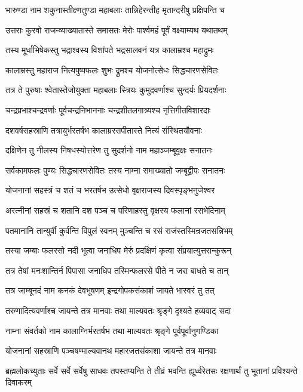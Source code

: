 \twolineshloka
{भारुण्डा नाम शकुनास्तीक्ष्णतुण्डा महाबलाः}
{तान्निहेरन्तीह मृतान्दरीषु प्रक्षिपन्ति च}


\twolineshloka
{उत्तराः कुरवो राजन्व्याख्यातास्ते समासतः}
{मेरोः पार्श्वमहं पूर्वं वक्ष्याम्यथ यथातथम्}


\twolineshloka
{तस्य मूर्धाभिषेकस्तु भद्राश्वस्य विशांपते}
{भद्रसालवनं यत्र कालाम्रश्च महाद्रुमः}


\twolineshloka
{कालाम्रस्तु महाराज नित्यपुष्पफलः शुभः}
{द्रुमश्च योजनोत्सेधः सिद्धचारणसेवितः}


\twolineshloka
{तत्र ते पुरुषाः श्वेतास्तेजोयुक्ता महाबलाः}
{स्त्रियः कुमुदवर्णाश्च सुन्दर्यः प्रियदर्शनाः}


\twolineshloka
{चन्द्रप्रभाश्चन्द्रवर्णाः पूर्वचन्द्रनिभाननाः}
{चन्द्रशीतलगात्र्यश्च नृत्तिगीतविशारदाः}


\twolineshloka
{दशवर्षसहस्राणि तत्रायुर्भरतर्षभ}
{कालाम्ररसपीतास्ते नित्यं संस्थितयौवनाः}


\twolineshloka
{दक्षिणेन तु नीलस्य निषधस्योत्तरेण तु}
{सुदर्शनो नाम महाञ्जम्बूवृक्षः सनातनः}


\twolineshloka
{सर्वकामफलः पुण्यः सिद्धचारणसेवितः}
{तस्य नाम्ना समाख्यातो जम्बूद्वीपः सनातनः}


\twolineshloka
{योजनानां सहस्त्रं च शतं च भरतर्षभ}
{उत्सेधो वृक्षराजस्य दिवस्पृङ्भनुजेश्वर}


\twolineshloka
{अरत्नीनां सहस्रं च शतानि दश पञ्च च}
{परिणाहस्तु वृक्षस्य फलानां रसभेदिनाम्}


\twolineshloka
{पतमानानि तान्युर्वी कुर्वन्ति विपुलं स्वनम्}
{मुञ्चन्ति च रसं राजंस्तस्मिन्रजतसन्निभम्}


\twolineshloka
{तस्या जम्बाः फलरसो नदी भूत्वा जनाधिप}
{मेरुं प्रदक्षिणं कृत्वा संप्रयात्युत्तरान्कुरून्}


\twolineshloka
{तत्र तेषां मनःशान्तिर्न पिपासा जनाधिप}
{तस्मिन्फलरसे पीते न जरा बाधते च तान्}


\twolineshloka
{तत्र जाम्बूनदं नाम कनकं देवभूषणम्}
{इन्द्रगोपकसंकाशं जायते भास्वरं तु तत्}


\twolineshloka
{तरुणादित्यवर्णाश्च जायन्ते तत्र मानवाः}
{तथा माल्यवतः श्रृङ्गे दृश्यते हव्यवाट् सदा}


\twolineshloka
{नाम्ना संवर्तको नाम कालाग्निर्भरतर्षभ}
{तथा माल्यवतः श्रृङ्गे पूर्वपूर्वानुगण्डिका}


\twolineshloka
{योजनानां सहस्राणि पञ्चषण्माल्यवानथ}
{महारजतसंकाशा जायन्ते तत्र मानवाः}


\threelineshloka
{ब्रह्मलोकच्युताः सर्वे सर्वे सर्वेषु साधवः}
{तपस्तप्यन्ति ते तीव्रं भवन्ति ह्यूर्ध्वरेतसः}
{रक्षणार्थं तु भूतानां प्रविश्यन्ते दिवाकरम्}


